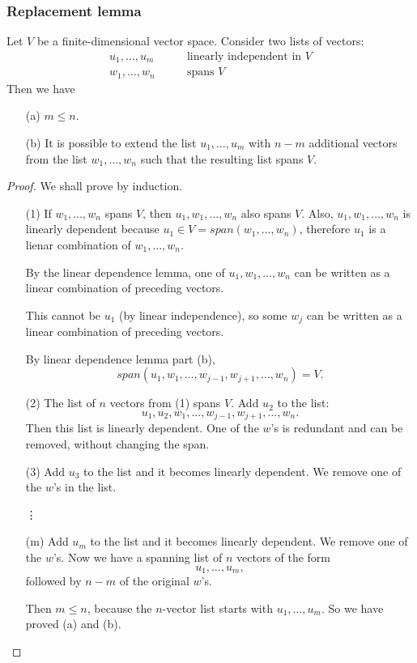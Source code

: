 \documentclass[11pt]{article}
\begin{document}
    \subsubsection{Replacement lemma}

    Let $V$ be a finite-dimensional vector space. Consider two lists of vectors:
    \begin{align*}
        u_1, \dots, u_m \qquad & \text{linearly independent in }V \\
        w_1, \dots, w_n \qquad & \text{spans }V
    \end{align*}
    Then we have
    \begin{enumerate}
        \item[(a)] \(m \leq n.\)
        \item[(b)] It is possible to extend the list \(u_1, \dots, u_m\) with \(n-m\) additional vectors from the list \(w_1, \dots, w_n\) such that the resulting list spans $V$.  
    \end{enumerate}

    \begin{proof}
        We shall prove by induction.

        \begin{enumerate}
            \item[(1)] If \(w_1, \dots, w_n\) spans $V$, then \(u_1, w_1, \dots, w_n\) also spans $V$. Also, \(u_1, w_1, \dots, w_n\) is linearly dependent because \(u_1 \in V = span(w_1, \dots, w_n)\), therefore \(u_1\) is a lienar combination of \(w_1, \dots, w_n.\) 
            
            By the linear dependence lemma, one of \(u_1, w_1, \dots, w_n\) can be written as a linear combination of preceding vectors.

            This cannot be \(u_1\) (by linear independence), so some \(w_j\) can be written as a linear combination of preceding vectors.

            By linear dependence lemma part (b), \[span(u_1, w_1, \dots, w_{j-1}, w_{j+1}, \dots, w_n) = V.\]

            \item[(2)] The list of $n$ vectors from (1) spans $V$. Add \(u_2\) to the list: \[u_1, u_2, w_1, \dots, w_{j-1}, w_{j+1}, \dots, w_n.\] Then this list is linearly dependent. One of the $w$'s is redundant and can be removed, without changing the span.
            \item[(3)] Add $u_3$ to the list and it becomes linearly dependent. We remove one of the $w$'s in the list.
            \item[\vdots]
            \item[(m)] Add \(u_m\) to the list and it becomes linearly dependent. We remove one of the $w$'s. Now we have a spanning list of $n$ vectors of the form \[u_1, \dots, u_m,\] followed by $n-m$ of the original $w$'s.
            
            Then \(m \leq n\), because the $n$-vector list starts with \(u_1, \dots, u_m.\) So we have proved (a) and (b).
        \end{enumerate}
    \end{proof}
\end{document}
